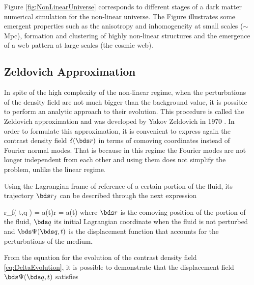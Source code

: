 Figure \ref{fig:NonLinearUniverse} corresponds to different stages of a 
dark matter numerical simulation for the non-linear universe. The Figure 
illustrates some emergent properties such as the anisotropy and 
inhomogeneity at small scales ($\sim$ Mpc), formation and clustering of
highly non-linear structures and the emergence of a web pattern at large
scales (the cosmic web).



	\subsection{Zeldovich Approximation}
	\label{subsec:Zeldovich'sApproximation}
	

In spite of the high complexity of the non-linear regime, when the
perturbations of the density field are not much bigger than the background
value, it is possible to perform an analytic approach to their evolution.
This procedure is called the Zeldovich approximation and was developed by
Yakov Zeldovich in 1970 \cite{zeldovich1970}. In order to formulate this
approximation, it is convenient to express again the contrast density 
field $\delta(\bds r)$ in terms of comoving coordinates instead of Fourier
normal modes. That is because in this regime the Fourier modes are not 
longer independent from each other and using them does not simplify the
problem, unlike the linear regime.


Using the Lagrangian frame of reference of a certain portion of the fluid,
its trajectory $\bds r_f$ can be described through the next expression


{ \bds r_f( t,\bds q ) = a(t)\bds r = a(t) }
where $\bds r$ is the comoving position of the portion of the fluid, 
$\bds q$ its initial Lagrangian coordinate when the fluid is not perturbed
and $\bds \Psi(\bds q,t)$ is the displacement function that accounts for 
the perturbations of the medium.


From the equation for the evolution of the contrast density field 
\ref{eq:DeltaEvolution}, it is possible to demonstrate that the 
displacement field $\bds \Psi(\bds q,t)$ satisfies \cite{Yoshisato2006}


